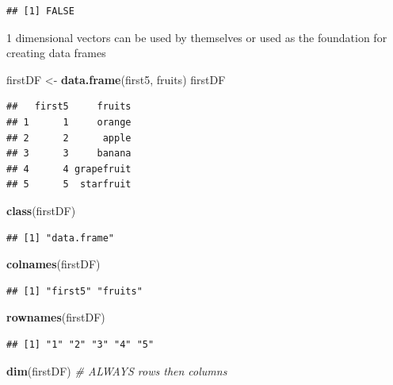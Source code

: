 \documentclass[
]{book}
\newenvironment{Shaded}{\begin{snugshade}}{\end{snugshade}}
\newcommand{\CommentTok}[1]{\textcolor[rgb]{0.56,0.35,0.01}{\textit{#1}}}
\newcommand{\FunctionTok}[1]{\textcolor[rgb]{0.13,0.29,0.53}{\textbf{#1}}}
\newcommand{\NormalTok}[1]{#1}
\newcommand{\OtherTok}[1]{\textcolor[rgb]{0.56,0.35,0.01}{#1}}
\begin{document}
\begin{verbatim}
## [1] FALSE
\end{verbatim}

1 dimensional vectors can be used by themselves or used as the foundation for creating data frames

\begin{Shaded}
\begin{Highlighting}[]
\NormalTok{firstDF }\OtherTok{\textless{}{-}} \FunctionTok{data.frame}\NormalTok{(first5, fruits)}
\NormalTok{firstDF}
\end{Highlighting}
\end{Shaded}

\begin{verbatim}
##   first5     fruits
## 1      1     orange
## 2      2      apple
## 3      3     banana
## 4      4 grapefruit
## 5      5  starfruit
\end{verbatim}

\begin{Shaded}
\begin{Highlighting}[]
\FunctionTok{class}\NormalTok{(firstDF)}
\end{Highlighting}
\end{Shaded}

\begin{verbatim}
## [1] "data.frame"
\end{verbatim}

\begin{Shaded}
\begin{Highlighting}[]
\FunctionTok{colnames}\NormalTok{(firstDF)}
\end{Highlighting}
\end{Shaded}

\begin{verbatim}
## [1] "first5" "fruits"
\end{verbatim}

\begin{Shaded}
\begin{Highlighting}[]
\FunctionTok{rownames}\NormalTok{(firstDF)}
\end{Highlighting}
\end{Shaded}

\begin{verbatim}
## [1] "1" "2" "3" "4" "5"
\end{verbatim}

\begin{Shaded}
\begin{Highlighting}[]
\FunctionTok{dim}\NormalTok{(firstDF) }\CommentTok{\# ALWAYS rows then columns}
\end{Highlighting}
\end{Shaded}
\end{document}

